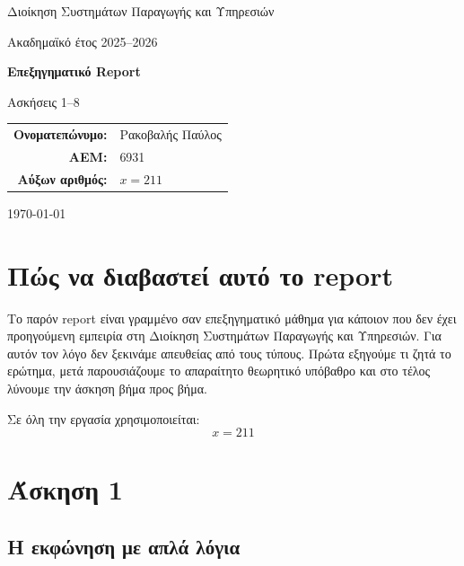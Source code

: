 \documentclass[12pt,a4paper]{article}
\newcommand{\studentname}{Ρακοβαλής Παύλος}
\newcommand{\studentid}{6931}
\newcommand{\xvalue}{211}
\begin{document}
\begin{titlepage}
    \centering
    \vspace*{2cm}

    {\Large Διοίκηση Συστημάτων Παραγωγής και Υπηρεσιών\par}
    \vspace{0.4cm}
    {\large Ακαδημαϊκό έτος 2025--2026\par}

    \vspace{2.2cm}
    {\Huge \textbf{Επεξηγηματικό Report}\par}
    \vspace{0.4cm}
    {\Large Ασκήσεις 1--8\par}

    \vspace{2.2cm}
    \begin{tabular}{rl}
        \textbf{Ονοματεπώνυμο:} & \studentname \\
        \textbf{ΑΕΜ:} & \studentid \\
        \textbf{Αύξων αριθμός:} & \(x = \xvalue\)
    \end{tabular}

    \vfill
    {\large \today\par}
\end{titlepage}

\tableofcontents
\newpage

\section*{Πώς να διαβαστεί αυτό το report}

Το παρόν report είναι γραμμένο σαν επεξηγηματικό μάθημα για κάποιον που δεν έχει προηγούμενη εμπειρία στη Διοίκηση Συστημάτων Παραγωγής και Υπηρεσιών. Για αυτόν τον λόγο δεν ξεκινάμε απευθείας από τους τύπους. Πρώτα εξηγούμε τι ζητά το ερώτημα, μετά παρουσιάζουμε το απαραίτητο θεωρητικό υπόβαθρο και στο τέλος λύνουμε την άσκηση βήμα προς βήμα.

Σε όλη την εργασία χρησιμοποιείται:
\[
x = 211
\]

\newpage

\section{Άσκηση 1}

\subsection{Η εκφώνηση με απλά λόγια}
\end{document}
